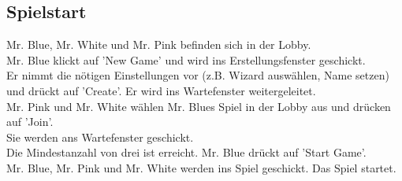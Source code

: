 \documentclass{article}
\begin{document}
	\subsection{Spielstart}
		Mr. Blue, Mr. White und Mr. Pink befinden sich in der Lobby. \\
		Mr. Blue klickt auf 'New Game' und wird ins Erstellungsfenster geschickt. \\
		Er nimmt die nötigen Einstellungen vor (z.B. Wizard auswählen, Name setzen) und drückt auf 'Create'. Er wird ins Wartefenster weitergeleitet.\\
		Mr. Pink und Mr. White wählen Mr. Blues Spiel in der Lobby aus und drücken auf 'Join'.\\
		Sie werden ans Wartefenster geschickt.\\
		Die Mindestanzahl von drei ist erreicht. Mr. Blue drückt auf 'Start Game'.\\
		Mr. Blue, Mr. Pink und Mr. White werden ins Spiel geschickt. Das Spiel startet.\\
\newpage
\addtolength{\oddsidemargin}{-4cm}
\addtolength{\topmargin}{-4cm}
\end{document}
